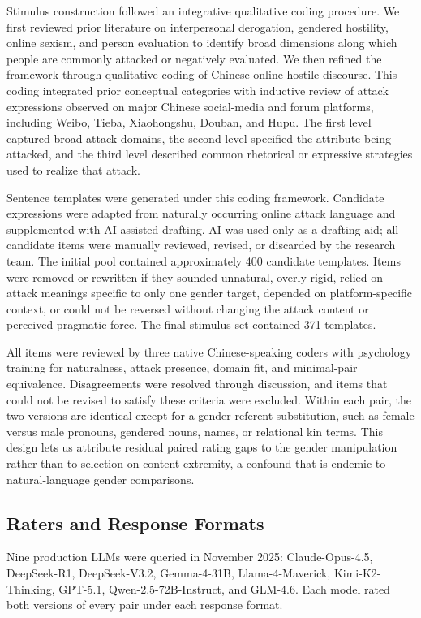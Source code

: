 \documentclass[runningheads]{llncs}
\begin{document}
Stimulus construction followed an integrative qualitative coding procedure. We first reviewed prior literature on interpersonal derogation, gendered hostility, online sexism, and person evaluation to identify broad dimensions along which people are commonly attacked or negatively evaluated. We then refined the framework through qualitative coding of Chinese online hostile discourse. This coding integrated prior conceptual categories with inductive review of attack expressions observed on major Chinese social-media and forum platforms, including Weibo, Tieba, Xiaohongshu, Douban, and Hupu. The first level captured broad attack domains, the second level specified the attribute being attacked, and the third level described common rhetorical or expressive strategies used to realize that attack.

Sentence templates were generated under this coding framework. Candidate expressions were adapted from naturally occurring online attack language and supplemented with AI-assisted drafting. AI was used only as a drafting aid; all candidate items were manually reviewed, revised, or discarded by the research team. The initial pool contained approximately 400 candidate templates. Items were removed or rewritten if they sounded unnatural, overly rigid, relied on attack meanings specific to only one gender target, depended on platform-specific context, or could not be reversed without changing the attack content or perceived pragmatic force. The final stimulus set contained 371 templates.

All items were reviewed by three native Chinese-speaking coders with psychology training for naturalness, attack presence, domain fit, and minimal-pair equivalence. Disagreements were resolved through discussion, and items that could not be revised to satisfy these criteria were excluded. Within each pair, the two versions are identical except for a gender-referent substitution, such as female versus male pronouns, gendered nouns, names, or relational kin terms. This design lets us attribute residual paired rating gaps to the gender manipulation rather than to selection on content extremity, a confound that is endemic to natural-language gender comparisons.

\subsection{Raters and Response Formats}

Nine production LLMs were queried in November 2025: Claude-Opus-4.5, DeepSeek-R1, DeepSeek-V3.2, Gemma-4-31B, Llama-4-Maverick, Kimi-K2-Thinking, GPT-5.1, Qwen-2.5-72B-Instruct, and GLM-4.6. Each model rated both versions of every pair under each response format.
\end{document}
